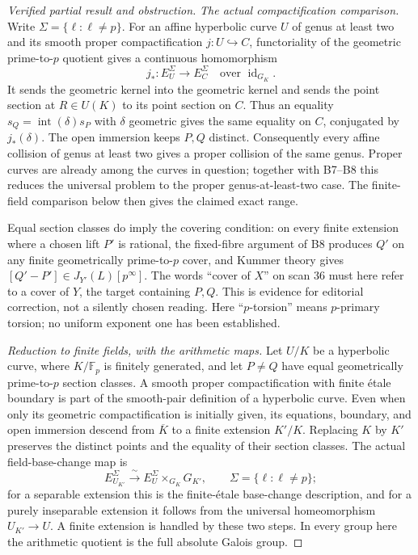 \begin{proof}[Verified partial result and obstruction]
\emph{The actual compactification comparison.}
Write $\Sigma=\{\ell:\ell\ne p\}$. For an affine hyperbolic
curve $U$ of genus at least two and its
smooth proper compactification $j:U\hookrightarrow C$, functoriality
of the geometric prime-to-$p$ quotient gives a continuous homomorphism
\[
 j_*:E_U^\Sigma\longrightarrow E_C^\Sigma
       \quad\text{over }\operatorname{id}_{G_K}.
\]
It sends the geometric kernel into the geometric kernel and sends
the point section at $R\in U(K)$ to its point section on $C$.
Thus an equality $s_Q=\operatorname{int}(\delta)s_P$ with
$\delta$ geometric gives the same equality on $C$, conjugated by
$j_*(\delta)$. The open immersion keeps $P,Q$ distinct.
Consequently every affine collision of genus at least two gives
a proper collision of the same genus. Proper curves are already
among the curves in question; together with B7--B8 this reduces the
universal problem to the proper genus-at-least-two case. The
finite-field comparison below then gives the claimed exact range.

Equal section classes do imply the covering condition: on every
finite extension where a chosen lift $P'$ is rational, the fixed-fibre
argument of B8 produces $Q'$ on any finite geometrically
prime-to-$p$ cover, and Kummer theory gives
$[Q'-P']\in J_{Y'}(L)[p^\infty]$.
The words ``cover of $X$'' on scan 36 must here refer to a cover of
$Y$, the target containing $P,Q$. This is evidence for editorial
correction, not a silently chosen reading. Here ``$p$-torsion'' means
$p$-primary torsion; no uniform exponent one has been established.

\emph{Reduction to finite fields, with the arithmetic maps.}
Let $U/K$ be a hyperbolic curve, where $K/\mathbb F_p$ is finitely
generated, and let $P\ne Q$ have equal geometrically prime-to-$p$
section classes. A smooth proper compactification with finite
\'etale boundary is part of the smooth-pair definition of a
hyperbolic curve. Even when only its geometric compactification is
initially given, its equations, boundary, and open immersion descend
from $\overline K$ to a finite extension $K'/K$. Replacing $K$ by
$K'$ preserves the distinct points and the equality of their section
classes. The actual field-base-change map is
\[
 E_{U_{K'}}^{\Sigma}\xrightarrow{\ \sim\ }
 E_U^{\Sigma}\times_{G_K}G_{K'},\qquad
 \Sigma=\{\ell:\ell\ne p\};
\]
for a separable extension this is the finite-\'etale base-change
description, and for a purely inseparable extension it follows from
the universal homeomorphism $U_{K'}\to U$. A finite extension is
handled by these two steps. In every group here the arithmetic
quotient is the full absolute Galois group.


\end{proof}
